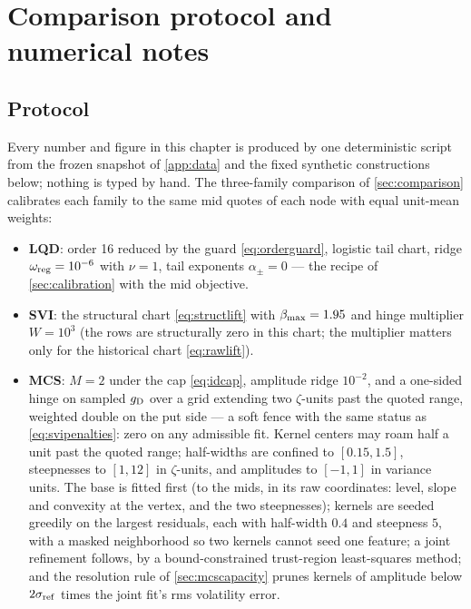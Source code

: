 \section{Comparison protocol and numerical notes}
\label{app:protocol}

\subsection*{Protocol}

Every number and figure in this chapter is produced by one
deterministic script from the frozen snapshot of \cref{app:data} and
the fixed synthetic constructions below; nothing is typed by hand.  The
three-family comparison of \cref{sec:comparison} calibrates each family
to the same mid quotes of each node with equal unit-mean weights:

\begin{itemize}
\item \textbf{LQD}: order 16 reduced by the guard \eqref{eq:orderguard},
logistic tail chart, ridge $\omega_{\rm reg}=10^{-6}$ with $\nu=1$,
tail exponents $\alpha_\pm=0$ --- the recipe
of \cref{sec:calibration} with the mid objective.
\item \textbf{SVI}: the structural chart \eqref{eq:structlift} with
$\beta_{\max}=1.95$ and hinge multiplier $W=10^{3}$ (the rows
are structurally zero in this chart; the multiplier matters only for
the historical chart \eqref{eq:rawlift}).
\item \textbf{MCS}: $M=2$ under the cap \eqref{eq:idcap}, amplitude
ridge $10^{-2}$, and a one-sided hinge on sampled $g_{\rm D}$ over a
grid extending two $\zeta$-units past the quoted range, weighted double
on the put side --- a soft fence with the same status as
\eqref{eq:svipenalties}: zero on any admissible fit.  Kernel centers
may roam half a unit past the quoted range; half-widths are confined to
$[0.15,1.5]$, steepnesses to $[1,12]$ in $\zeta$-units, and amplitudes
to $[-1,1]$ in variance units.  The base is
fitted first (to the mids, in its raw coordinates: level, slope and
convexity at the vertex, and the two steepnesses); kernels are seeded
greedily on the largest residuals, each with half-width $0.4$ and
steepness $5$, with a masked neighborhood so two kernels cannot seed
one feature; a joint refinement follows, by a bound-constrained
trust-region least-squares method; and the resolution rule of
\cref{sec:mcscapacity} prunes kernels of amplitude below
$2\sigma_{\rm ref}$ times the joint fit's rms volatility error.
\end{itemize}

